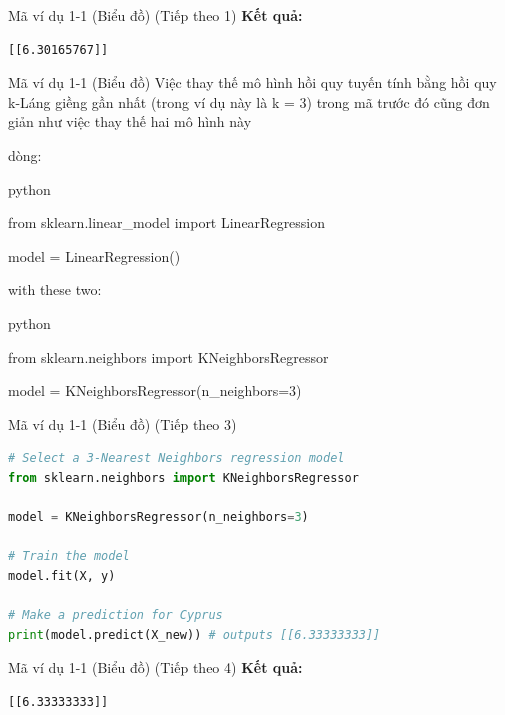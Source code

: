 \documentclass[aspectratio=169]{beamer}
\begin{document}
\begin{frame}[fragile]{Mã ví dụ 1-1 (Biểu đồ) (Tiếp theo 1)}
\textbf{Kết quả:}
\begin{verbatim}
[[6.30165767]]
\end{verbatim}


\end{frame}

\begin{frame}[allowframebreaks]{Mã ví dụ 1-1 (Biểu đồ)}
Việc thay thế mô hình hồi quy tuyến tính bằng hồi quy k-Láng giềng gần nhất (trong ví dụ này là k = 3) trong mã trước đó cũng đơn giản như việc thay thế hai mô hình này

dòng:



 python

from sklearn.linear\_model import LinearRegression



model = LinearRegression()

  



with these two:



  python

from sklearn.neighbors import KNeighborsRegressor



model = KNeighborsRegressor(n\_neighbors=3)

 


\end{frame}

\begin{frame}[fragile]{Mã ví dụ 1-1 (Biểu đồ) (Tiếp theo 3)}
\begin{lstlisting}[language=Python]
# Select a 3-Nearest Neighbors regression model
from sklearn.neighbors import KNeighborsRegressor

model = KNeighborsRegressor(n_neighbors=3)

# Train the model
model.fit(X, y)

# Make a prediction for Cyprus
print(model.predict(X_new)) # outputs [[6.33333333]]
\end{lstlisting}


\end{frame}

\begin{frame}[fragile]{Mã ví dụ 1-1 (Biểu đồ) (Tiếp theo 4)}
\textbf{Kết quả:}
\begin{verbatim}
[[6.33333333]]
\end{verbatim}


\end{frame}
\end{document}
